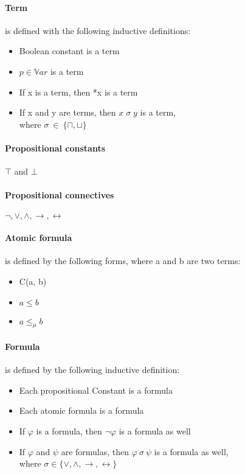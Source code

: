 \documentclass{article}
\begin{document}
	\paragraph{Term} 
is defined with the following inductive definitions:
	\label{sec:term-inductive-definition}
		\begin{itemize}
			\item Boolean constant is a term
			\item $p \in \mathbb{V}ar$ is a term
			\item If x is a term, then *x is a term
			\item If x and y are terms, then $x \; \sigma \; y $ is a term,\\
				where $\sigma \: \in \: \{\sqcap, \sqcup\}$
		\end{itemize}	

	\paragraph{Propositional constants}
$\top$ and $\bot$ 

	\paragraph{Propositional connectives} 
$\neg, \vee, \wedge, \rightarrow, \leftrightarrow$

	\paragraph{Atomic formula}
is defined by the following forms, where a and b are two terms:
		\begin{itemize}
			\item C(a, b)
			\item $a \le b$
			\item $a \le_\mu b$
		\end{itemize}

	\paragraph{Formula}
is defined by the following inductive definition:
	\label{sec:formula-inductive-definition}
		\begin{itemize}
			\item Each propositional Constant is a formula
			\item Each atomic formula is a formula 
			\item If $\varphi$ is a formula, then $\neg{\varphi}$ is a formula as well
			\item If $\varphi$ and $\psi$ are formulas, then $\varphi \: \sigma \: \psi $ is a formula as well,\\
				where $\sigma \in \{\vee, \wedge, \rightarrow, \leftrightarrow\}$
		\end{itemize}
\end{document}
